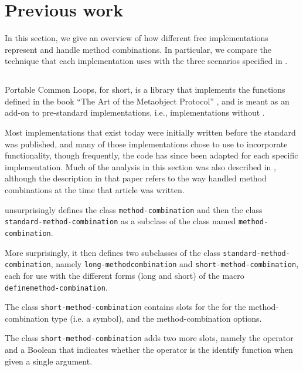 \section{Previous work}

In this section, we give an overview of how different free
\commonlisp{} implementations represent and handle method
combinations.  In particular, we compare the technique that each
implementation uses with the three scenarios specified in
.

\subsection{\pcl{}}
\label{sec-pcl}

Portable Common Loops, \pcl{} for short, is a library that implements
the functions defined in the book ``The Art of the Metaobject
Protocol'' \cite{Kiczales:1991:AMP:574212}, and is meant as an add-on
to pre-standard \commonlisp{} implementations, i.e., implementations
without \clos{}.

Most \commonlisp{} implementations that exist today were initially
written before the standard was published, and many of those
implementations chose to use \pcl{} to incorporate \clos{}
functionality, though frequently, the code has since been adapted for
each specific implementation.  Much of the analysis in this section
was also described in \cite{verna.18.els}, although the description in
that paper refers to the way \sbcl{} handled method combinations at
the time that article was written.

\pcl{} unsurprisingly defines the class \texttt{method\--combination}
and then the class \texttt{standard\--method\--combination} as a
subclass of the class named \texttt{method\--combination}.

More surprisingly, it then defines two subclasses of the class
\texttt{standard\--method\--combination}, namely
\texttt{long\--method\-combination} and
\texttt{short\--method\--combination}, each for use with the different
forms (long and short) of the macro
\texttt{define\-method\--combination}.

The class \texttt{short-method-combination} contains slots for the for
the method-combination type (i.e. a symbol), and the
method-combination options.

The class \texttt{short-method-combination} adds two more slots,
namely the operator and a Boolean that indicates whether the operator
is the identify function when given a single argument.

